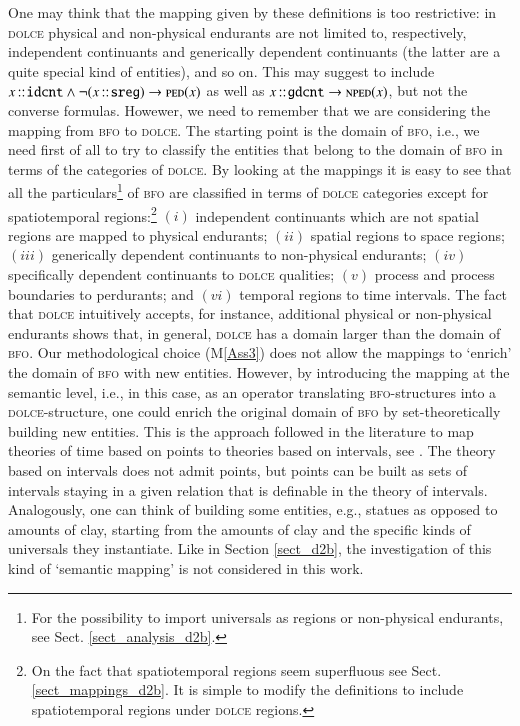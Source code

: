 \documentclass[ao]{iosart2x}
\newcommand{\nb}[1]{\textcolor{red}{$|$}\marginpar{\hspace*{-0cm}\parbox{20mm}{\scriptsize\raggedright\textcolor{red}{#1}}}}
\newcommand{\cn}[1]{\mathtt{#1}}
\newcommand{\dolce}{{\textsc{dolce}}}
\newcommand{\bfo}{{\textsc{bfo}}}
\newcommand {\NPEDdcat} {\textsc{nped}}
\newcommand {\PEDdcat} {\textsc{ped}}
\newcommand{\idcntbcat}{\cn{idcnt}}
\newcommand{\gdcntbcat}{\cn{gdcnt}}
\newcommand{\sregbcat}{\cn{sreg}}
\newcommand{\bfoiof}[1]{{\,::_{#1\:\!}}}
\begin{document}
One may think that the mapping given by these definitions is too restrictive: in {\dolce} physical and non-physical endurants are not limited to, respectively, independent continuants and generically dependent continuants (the latter are a quite special kind of entities), and so on. This may suggest to include  $x \bfoiof{} \idcntbcat \land \neg(x \bfoiof{} \sregbcat) \to \PEDdcat(x)$ as well as $x \bfoiof{} \gdcntbcat \to \NPEDdcat(x)$, but not the converse formulas. Howewer, we need to remember that we are considering the mapping from {\bfo} to {\dolce}. The starting point is the domain of {\bfo}, i.e., we need first of all to try to classify the entities that belong to the domain of {\bfo} in terms of the categories of {\dolce}. 
By looking at the mappings it is easy to see that all the particulars\footnote{For the possibility to import universals as regions or non-physical endurants, see Sect. \ref{sect_analysis_d2b}.} of {\bfo} are classified in terms of {\dolce} categories except for spatiotemporal regions:\footnote{On the fact that spatiotemporal regions seem superfluous see Sect. \ref{sect_mappings_d2b}. It is simple to modify the definitions to include spatiotemporal regions under {\dolce} regions.} $(i)$ independent continuants which are not spatial regions are mapped to physical endurants; $(ii)$ spatial regions to space regions; $(iii)$ generically dependent continuants to non-physical endurants; $(iv)$ specifically dependent continuants to {\dolce} qualities; $(v)$ process and process boundaries to perdurants; and $(vi)$ temporal regions to time intervals. The fact that {\dolce} intuitively accepts, for instance, additional physical or non-physical endurants shows that, in general, {\dolce} has a domain larger than the domain of {\bfo}. Our methodological choice (M\ref{Ass3}) does not allow the mappings to `enrich' the domain of {\bfo} with new entities. %
However, by introducing the mapping at the semantic level, i.e., in this case, as an operator translating {\bfo}-structures into a {\dolce}-structure, one could enrich the original domain of {\bfo} by set-theoretically building new entities. This is the approach followed in the literature to map theories of time based on points to theories based on intervals, see \citep{Van-Benthem:1983ka}. %
The theory based on intervals does not admit points, but points can be built as sets of intervals staying in a given relation that is definable in the theory of intervals.  Analogously, one can think of building some entities, e.g., statues as opposed to amounts of clay, starting from the amounts of clay and the specific kinds of universals they instantiate. Like in Section \ref{sect_d2b}, the investigation of this kind of `semantic mapping' is not considered in this work.%
\end{document}

